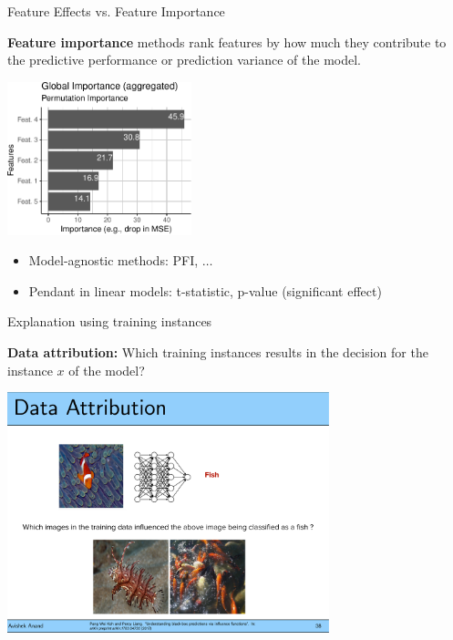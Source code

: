\documentclass[11pt,compress,t,notes=noshow, aspectratio=169, xcolor=table]{beamer}
\begin{document}
\begin{frame}{Feature Effects vs. Feature Importance}

	\textbf{Feature importance} methods rank features by how much they contribute to the predictive performance or prediction variance of the model.
	\begin{center}
		\includegraphics[page=1, width=0.4\textwidth]{figure/feature-importance}
	\end{center}
	\begin{itemize}
		\item Model-agnostic methods: PFI, $\hdots$
		\item Pendant in linear models: t-statistic, p-value (significant effect)
	\end{itemize}

\end{frame}


\begin{frame}{Explanation using training instances~}

	\textbf{Data attribution:} Which training instances results in the decision for the instance $x$ of the model?
	\begin{center}
		\includegraphics[page=1, width=0.7\textwidth]{figure/fish-attribution.pdf}
	\end{center}
\end{frame}
\end{document}
